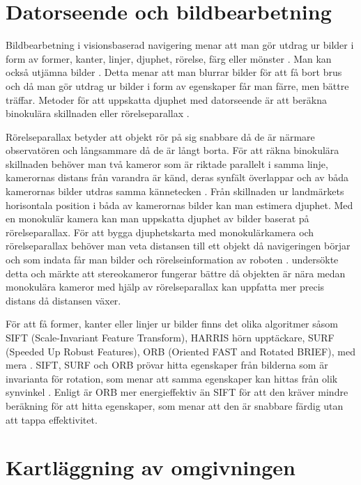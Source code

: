 \section{Datorseende och bildbearbetning}

Bildbearbetning i visionsbaserad navigering menar att man gör utdrag ur bilder i form av former, kanter, linjer, djuphet, rörelse, färg eller mönster \citep{982903}. Man kan också utjämna bilder \citep{mapbuildingsift}. Detta menar att man blurrar bilder för att få bort brus och då man gör utdrag ur bilder i form av egenskaper får man färre, men bättre träffar. Metoder för att uppskatta djuphet med datorseende är att beräkna binokulära skillnaden eller rörelseparallax \citep{suomimainittu}. 

Rörelseparallax betyder att objekt rör på sig snabbare då de är närmare observatören och långsammare då de är långt borta. För att räkna binokulära skillnaden behöver man två kameror som är riktade parallelt i samma linje, kamerornas distans från varandra är känd, deras synfält överlappar och av båda kamerornas bilder utdras samma kännetecken \citep{suomimainittu}. Från skillnaden ur landmärkets horisontala position i båda av kamerornas bilder kan man estimera djuphet. Med en monokulär kamera kan man uppskatta djuphet av bilder baserat på rörelseparallax. För att bygga djuphetskarta med monokulärkamera och rörelseparallax behöver man veta distansen till ett objekt då navigeringen börjar och som indata får man bilder och rörelseinformation av roboten \citep{suomimainittu}. \cite{suomimainittu} undersökte detta och märkte att stereokameror fungerar bättre då objekten är nära medan monokulära kameror med hjälp av rörelseparallax kan uppfatta mer precis distans då distansen växer. 

För att få former, kanter eller linjer ur bilder finns det olika algoritmer såsom SIFT (Scale-Invariant Feature Transform), HARRIS hörn upptäckare, SURF (Speeded Up Robust Features), ORB (Oriented FAST and Rotated BRIEF), med mera \citep{orb, slamproblem, mapbuildingsift}. SIFT, SURF och ORB prövar hitta egenskaper från bilderna som är invarianta för rotation, som menar att samma egenskaper kan hittas från olik synvinkel \citep{orb}. Enligt \cite{orb} är ORB mer energieffektiv än SIFT för att den kräver mindre beräkning för att hitta egenskaper, som menar att den är snabbare färdig utan att tappa effektivitet.

\section{Kartläggning av omgivningen}

